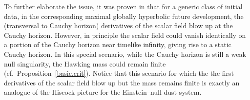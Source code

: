 \documentclass[10pt, reqno]{amsart}
\newtheorem{theorem}{Theorem}[section]
\theoremstyle{definition}
\theoremstyle{remark}
\numberwithin{equation}{section}
\newcommand{\0}{\emptyset}
\begin{document}

To further elaborate the issue, it was proven in \cite{LO.interior, LO.exterior} that for a generic class of initial data, in the corresponding maximal globally hyperbolic future development, the (transversal to Cauchy horizon) derivatives of the scalar field blow up at the Cauchy horizon. However, in principle the scalar field could vanish identically on a portion of the Cauchy horizon near timelike infinity, giving rise to a static Cauchy horizon. In this special scenario, while the Cauchy horizon is still a weak null singularity, the Hawking mass could remain finite (cf.~Proposition~\ref{basic.crit}). Notice that this scenario for which the the first derivatives of the scalar field blow up but the mass remains finite is exactly an analogue of the Hiscock picture for the Einstein--null dust system.

%
%
%
\end{document}
